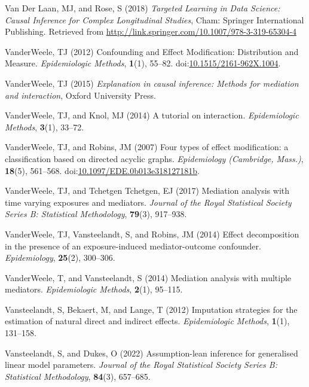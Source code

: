 \documentclass[
  single column]{article}
\newlength{\cslhangindent}
\newenvironment{CSLReferences}[2] %
 {\begin{list}{}{%
  \setlength{\itemindent}{0pt}
  \setlength{\leftmargin}{0pt}
  \setlength{\parsep}{0pt}
  \ifodd #1
   \setlength{\leftmargin}{\cslhangindent}
   \setlength{\itemindent}{-1\cslhangindent}
  \fi
  \setlength{\itemsep}{#2\baselineskip}}}
 {\end{list}}
\begin{document}
\begin{CSLReferences}{1}{0}
Van Der Laan, MJ, and Rose, S (2018) \emph{Targeted Learning in Data
Science: Causal Inference for Complex Longitudinal Studies}, Cham:
Springer International Publishing. Retrieved from
\url{http://link.springer.com/10.1007/978-3-319-65304-4}

VanderWeele, TJ (2012) Confounding and Effect Modification: Distribution
and Measure. \emph{Epidemiologic Methods}, \textbf{1}(1), 55--82.
doi:\href{https://doi.org/10.1515/2161-962X.1004}{10.1515/2161-962X.1004}.

VanderWeele, TJ (2015) \emph{Explanation in causal inference: Methods
for mediation and interaction}, Oxford University Press.

VanderWeele, TJ, and Knol, MJ (2014) A tutorial on interaction.
\emph{Epidemiologic Methods}, \textbf{3}(1), 33--72.

VanderWeele, TJ, and Robins, JM (2007) Four types of effect
modification: a classification based on directed acyclic graphs.
\emph{Epidemiology (Cambridge, Mass.)}, \textbf{18}(5), 561--568.
doi:\href{https://doi.org/10.1097/EDE.0b013e318127181b}{10.1097/EDE.0b013e318127181b}.

VanderWeele, TJ, and Tchetgen Tchetgen, EJ (2017) Mediation analysis
with time varying exposures and mediators. \emph{Journal of the Royal
Statistical Society Series B: Statistical Methodology}, \textbf{79}(3),
917--938.

VanderWeele, TJ, Vansteelandt, S, and Robins, JM (2014) Effect
decomposition in the presence of an exposure-induced mediator-outcome
confounder. \emph{Epidemiology}, \textbf{25}(2), 300--306.

VanderWeele, T, and Vansteelandt, S (2014) Mediation analysis with
multiple mediators. \emph{Epidemiologic Methods}, \textbf{2}(1),
95--115.

Vansteelandt, S, Bekaert, M, and Lange, T (2012) Imputation strategies
for the estimation of natural direct and indirect effects.
\emph{Epidemiologic Methods}, \textbf{1}(1), 131--158.

Vansteelandt, S, and Dukes, O (2022) Assumption-lean inference for
generalised linear model parameters. \emph{Journal of the Royal
Statistical Society Series B: Statistical Methodology}, \textbf{84}(3),
657--685.


\end{CSLReferences}
\end{document}
